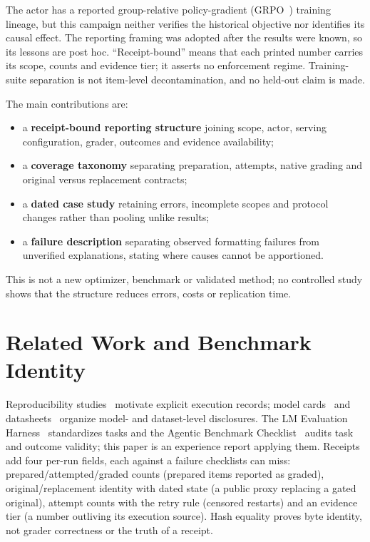 \documentclass[a4paper,runningheads]{llncs}
\begin{document}
The actor has a reported group-relative policy-gradient (GRPO~\cite{shao2024deepseekmath})
training lineage, but this campaign neither verifies the historical objective
nor identifies its causal effect. The reporting framing was adopted after the
results were known, so its lessons are post hoc. ``Receipt-bound'' means that
each printed number carries its scope, counts and evidence tier; it asserts no
enforcement regime. Training-suite separation is not item-level
decontamination, and no held-out claim is made.

The main contributions are:
\begin{itemize}\setlength{\itemsep}{0pt}\setlength{\parskip}{0pt}
\item a \textbf{receipt-bound reporting structure} joining scope, actor,
serving configuration, grader, outcomes and evidence availability;
\item a \textbf{coverage taxonomy} separating preparation, attempts, native
grading and original versus replacement contracts;
\item a \textbf{dated case study} retaining errors, incomplete scopes and
protocol changes rather than pooling unlike results;
\item a \textbf{failure description} separating observed formatting failures
from unverified explanations, stating where causes cannot be apportioned.
\end{itemize}
This is not a new optimizer, benchmark or validated method; no controlled study
shows that the structure reduces errors, costs or replication time.

\section{Related Work and Benchmark Identity}
Reproducibility studies~\cite{henderson2018deep,pineau2020improving} motivate
explicit execution records; model cards~\cite{mitchell2019modelcards} and
datasheets~\cite{gebru2021datasheets} organize model- and dataset-level
disclosures. The LM Evaluation Harness~\cite{biderman2024lessons} standardizes
tasks and the Agentic Benchmark Checklist~\cite{zhu2025abc} audits task and
outcome validity; this paper is an experience report applying them. Receipts
add four per-run fields, each against a failure checklists can miss: prepared/attempted/graded counts (prepared items reported as graded),
original/replacement identity with dated state (a public proxy replacing a
gated original), attempt counts with the retry rule (censored restarts) and an
evidence tier (a number outliving its execution source). Hash equality proves
byte identity, not grader correctness or the truth of a receipt.
\end{document}
